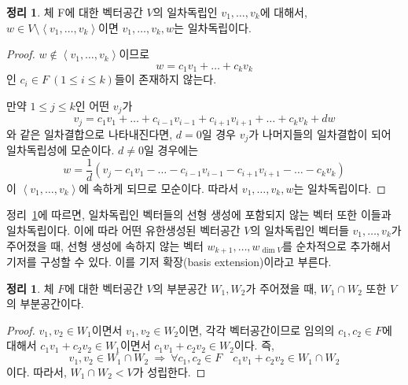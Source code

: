 \documentclass[unfonts,oneside,a4paper]{oblivoir}
\theoremstyle{definition}
\theoremstyle{theorem}
\newtheorem{theorem}[definition]{정리}
\theoremstyle{theorem}
\theoremstyle{remark}
\theoremstyle{remark}
\theoremstyle{remark}
\theoremstyle{remark}
\renewcommand{\vec}[1]{\bm{\mathit{#1}}}
\begin{document}
\begin{theorem}\label{thm:independence}
    체 F에 대한 벡터공간 $V$의 일차독립인 $\vec v_1, \dots, \vec v_k$에 대해서, $\vec w \in V \setminus \left<\vec v_1 , \dots, \vec v_k\right>$이면 $\vec v_1, \dots, \vec v_k, \vec w$는 일차독립이다.
\end{theorem}

\begin{proof}
    $\vec w \notin \left< \vec v_1, \dots, \vec v_k \right>$이므로
    \begin{equation*}
        \vec w = c_1 \vec v_1 + \dots + c_k \vec v_k
    \end{equation*}
    인 $c_i \in F \ (1 \leq i \leq k)$들이 존재하지 않는다.

    만약 $1 \leq j \leq k$인 어떤 $\vec v_j$가
    \begin{equation*}
        \vec v_j = c_1 \vec v_1 + \dots + c_{i - 1} \vec v_{i - 1} + c_{i + 1} \vec v_{i + 1} + \dots + c_k \vec v_k + d \vec w
    \end{equation*}
    와 같은 일차결합으로 나타내진다면, $d = 0$일 경우 $\vec v_j$가 나머지들의 일차결합이 되어 일차독립성에 모순이다.
    $d \neq 0$일 경우에는
    \begin{equation*}
        \vec w = \frac1d (\vec v_j - c_1 \vec v_1 - \dots - c_{i - 1} \vec v_{i - 1} - c_{i + 1} \vec v_{i + 1} - \dots - c_k \vec v_k)
    \end{equation*}
    이 $\left< \vec v_1, \dots, \vec v_k \right>$에 속하게 되므로 모순이다.
    따라서 $\vec v_1, \dots, \vec v_k, \vec w$는 일차독립이다.
\end{proof}

정리~\ref{thm:independence}에 따르면, 일차독립인 벡터들의 선형 생성에 포함되지 않는 벡터 또한 이들과 일차독립이다.
이에 따라 어떤 유한생성된 벡터공간 $V$의 일차독립인 벡터들 $\vec v_1, \dots, \vec v_k$가 주어졌을 때, 선형 생성에 속하지 않는 벡터 $\vec w_{k + 1}, \dots, \vec w_{\dim V}$를 순차적으로 추가해서 기저를 구성할 수 있다.
이를 기저 확장(basis extension)이라고 부른다.

\begin{theorem} \label{thm:intersection}
    체 $F$에 대한 벡터공간 $V$의 부분공간 $W_1, W_2$가 주어졌을 때, $W_1 \cap W_2$ 또한 $V$의 부분공간이다.
\end{theorem}

\begin{proof}
    $\vec v_1, \vec v_2 \in W_1$이면서 $\vec v_1, \vec v_2 \in W_2$이면, 각각 벡터공간이므로 임의의 $c_1, c_2 \in F$에 대해서 $c_1 \vec v_1 + c_2 \vec v_2 \in W_1$이면서 $c_1 \vec v_1 + c_2 \vec v_2 \in W_2$이다.
    즉,
    \[
        \vec v_1, \vec v_2 \in W_1 \cap W_2\ \Rightarrow\ \forall c_1, c_2 \in F \quad c_1 \vec v_1 + c_2 \vec v_2 \in W_1 \cap W_2
    \]
    이다.
    따라서, $W_1 \cap W_2 < V$가 성립한다.
\end{proof}
\end{document}
